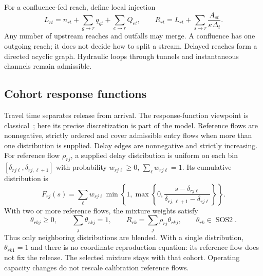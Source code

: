 \documentclass[10pt,a4paper]{article}
\newcommand{\SOS}{\operatorname{SOS2}}
\begin{document}
For a confluence-fed reach, define local injection
\begin{equation}
L_{rt}=n_{rt}
       +\sum_{g\to r}q_{gt}+\sum_{e\to r}Q_{et},\qquad
R_{rt}=L_{rt}+\sum_{s\to r}\frac{A_{st}}{\kappa\Delta_t}.
\label{eq:confluence}
\end{equation}
Any number of upstream reaches and outfalls may merge. A confluence has one
outgoing reach; it does not decide how to split a stream. Delayed reaches
form a directed acyclic graph. Hydraulic loops through tunnels and
instantaneous channels remain admissible.

\subsection{Cohort response functions}

Travel time separates release from arrival. The response-function viewpoint
is classical~\cite{dooge}; here its precise discretization is part of the
model. Reference flows are nonnegative, strictly ordered and cover admissible
entry flows when more than one distribution is supplied. Delay edges are
nonnegative and strictly increasing. For reference flow $\rho_{rj}$, a supplied delay distribution is uniform
on each bin $[\delta_{rj\ell},\delta_{rj,\ell+1}]$ with probability
$w_{rj\ell}\ge0$, $\sum_\ell w_{rj\ell}=1$. Its cumulative distribution is
\begin{equation}
F_{rj}(s)=\sum_\ell w_{rj\ell}
\min\!\left\{1,\max\!\left\{0,
 \frac{s-\delta_{rj\ell}}{\delta_{rj,\ell+1}-\delta_{rj\ell}}\right\}\right\}.
\label{eq:cdf}
\end{equation}
With two or more reference flows, the mixture weights satisfy
\begin{equation}
\theta_{rkj}\ge0,\qquad \sum_j\theta_{rkj}=1,\qquad
R_{rk}=\sum_j\rho_{rj}\theta_{rkj},\qquad \theta_{rk}\in\SOS.
\label{eq:delayweights}
\end{equation}
Thus only neighboring distributions are blended. With a single distribution,
$\theta_{rk1}=1$ and there is no coordinate reproduction equation: its
reference flow does not fix the release. The selected mixture
stays with that cohort. Operating capacity changes do not rescale calibration
reference flows.
\end{document}
